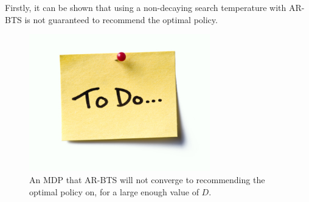     Firstly, it can be shown that using a non-decaying search temperature with AR-BTS is not guaranteed to recommend the optimal policy.
    
    \begin{figure}
        \centering
        \includegraphics[width=0.7\textwidth]{figures/todo.jpg}
        \caption{An MDP that AR-BTS will not converge to recommending the optimal policy on, for a large enough value of $D$.}
        \label{fig:ar_gen_mdp}
    \end{figure}

